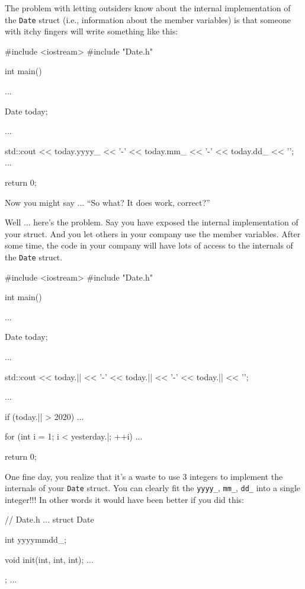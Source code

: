 The problem with letting outsiders know about the internal
implementation of the \texttt{Date} struct (i.e., information about the
member variables) is that someone with itchy fingers will write
something like this:

\begin{consolethree}[escapeinside=||]
#include <iostream>
#include "Date.h"

int main()
{
    ...
    
    Date today;

    ...

    std::cout << today.yyyy_ << '-'
              << today.mm_ << '-'
              << today.dd_ << '\n';
    ...

    return 0;
}
\end{consolethree}

Now you might say ... ``So what? It does work, correct?''

Well ... here's the problem. Say you have exposed
the internal implementation of your struct. And you let others in your
company use the member variables. After some time, the code in your
company will have lots of access to the internals of the \texttt{Date}
struct.

\begin{consolethree}[escapeinside=||]
#include <iostream>
#include "Date.h"

int main()
{
    ...

    Date today;

    ...

    std::cout << today.|| << '-'
              << today.|| << '-'
              << today.|| << '\n';

    ...
    
    if (today.|| > 2020)
    {
        ...
    }

    for (int i = 1; i < yesterday.|; ++i)
    {
        ...
    }

    return 0;
}
\end{consolethree}

One fine day, you realize that it's a waste to use 3
integers to implement the internals of your \texttt{Date} struct. You can
clearly fit the \texttt{yyyy\_}, \texttt{mm\_}, \texttt{dd\_} into a single
integer!!! In other words it would have been better if you did this:

\begin{consolethree}[escapeinside=||]
// Date.h
...
struct Date
{
    int yyyymmdd_;

    void init(int, int, int);
    ...
};
...
\end{consolethree}

